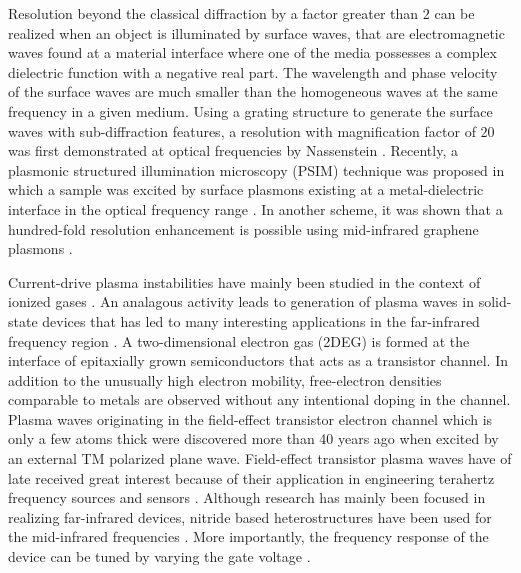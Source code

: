 \documentclass[12pt]{article}
\begin{document}
Resolution beyond the classical diffraction by a factor greater than $2$ can be realized when an object is illuminated by surface waves, that are electromagnetic waves found at a material interface where one of the media possesses a complex dielectric function with a negative real part. The wavelength and phase velocity of the surface waves are much smaller than the homogeneous waves at the same frequency in a given medium. Using a grating structure to generate the surface waves with sub-diffraction features, a resolution with magnification factor of $20$ was first demonstrated at optical frequencies by Nassenstein \cite{Nassenstein1970}. Recently, a plasmonic structured illumination microscopy (PSIM) technique was proposed in which a sample was excited by surface plasmons existing at a metal-dielectric interface in the optical frequency range \cite{Wei2010}. In another scheme, it was shown that a hundred-fold resolution enhancement is possible using mid-infrared
graphene plasmons \cite{Zeng2014}.

Current-drive plasma instabilities have mainly been studied in the context of ionized gases \cite{9781489947871}.  An analagous activity leads to generation  of plasma waves in solid-state devices \cite{Kempa1991} that has led to many interesting applications in the far-infrared frequency region \cite{Dyer_2016, Wu2015}. A two-dimensional electron gas (2DEG) is formed at the interface of epitaxially grown semiconductors that acts as a transistor channel. In addition to the unusually high electron mobility, free-electron densities comparable to metals are observed without any intentional doping in the channel. Plasma waves originating in the field-effect transistor electron channel which is only a few atoms thick were discovered more than 40 years ago \cite{Stern1967a, Allen1977} when excited by an external TM polarized plane wave. Field-effect transistor plasma waves have of late received great interest because of their application in engineering terahertz frequency sources and
sensors \cite{Dyakonov1993, Dyakonov1996, Popov2005, Otsuji2006, Dyakonov2005}. Although research has mainly been focused in realizing far-infrared devices, nitride based heterostructures have been used for the mid-infrared frequencies
\cite{Hofstetter2002}. More importantly, the frequency response of the device can be tuned by varying the gate voltage \cite{Fatimy2010, Rabbaa2011}.
\end{document}
